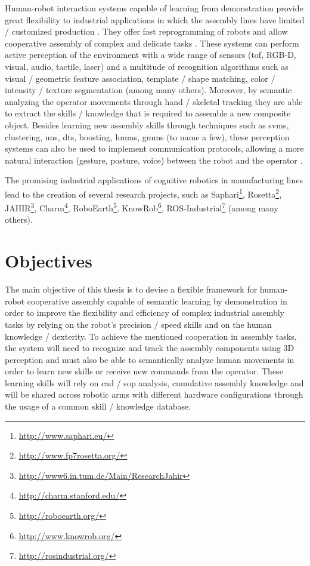 Human-robot interaction systems capable of learning from demonstration provide great flexibility to industrial applications in which the assembly lines have limited / customized production \cite{Patel2012}. They offer fast reprogramming of robots and allow cooperative assembly of complex and delicate tasks \cite{Sumi2009,Edsinger2007}. These systems can perform active perception of the environment \cite{Yan2014,Goodrich2007} with a wide range of sensors (\gls{tof}, RGB-D, visual, audio, tactile, laser) and a multitude of recognition algorithms such as visual / geometric feature association, template / shape matching, color / intensity / texture segmentation (among many others). Moreover, by semantic analyzing the operator movements \cite{Roitberg2014} through hand / skeletal tracking they are able to extract the skills / knowledge \cite{Nikolaidis14,Goto2013} that is required to assemble a new composite object. Besides learning new assembly skills through techniques such as \glspl{svm}, clustering, \glspl{nn}, \glspl{dt}, boosting, \glspl{hmm}, \glspl{gmm} (to name a few), these perception systems can also be used to implement communication protocols, allowing a more natural interaction (gesture, posture, voice) between the robot and the operator \cite{Gleeson2013,Calisgan2012,Haddadi2013}.

The promising industrial applications of cognitive robotics in manufacturing lines lead to the creation of several research projects, such as Saphari\footnote{\url{http://www.saphari.eu/}}, Rosetta\footnote{\url{http://www.fp7rosetta.org/}}, JAHIR\footnote{\url{http://www6.in.tum.de/Main/ResearchJahir}}, Charm\footnote{\url{http://charm.stanford.edu/}}, RoboEarth\footnote{\url{http://roboearth.org/}}, KnowRob\footnote{\url{http://www.knowrob.org/}}, ROS-Industrial\footnote{\url{http://rosindustrial.org/}} (among many others).



\section{Objectives}

The main objective of this thesis is to devise a flexible framework for human-robot cooperative assembly capable of semantic learning by demonstration in order to improve the flexibility and efficiency of complex industrial assembly tasks by relying on the robot's precision / speed skills and on the human knowledge / dexterity. To achieve the mentioned cooperation in assembly tasks, the system will need to recognize and track the assembly components using 3D perception and must also be able to semantically analyze human movements in order to learn new skills or receive new commands from the operator. These learning skills will rely on \gls{cad} / \gls{sop} analysis, cumulative assembly knowledge and will be shared across robotic arms with different hardware configurations through the usage of a common skill / knowledge database.


